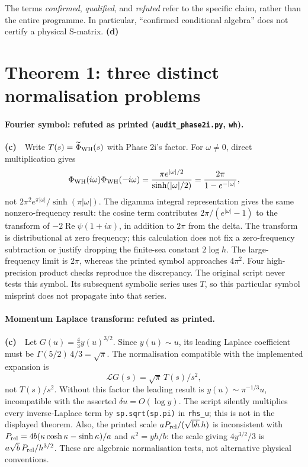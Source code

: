 \documentclass[11pt,a4paper]{article}
\newcommand{\Lc}{\textbf{(c)}\ }
\newcommand{\Ld}{\textbf{(d)}\ }
\newcommand{\scr}{\texttt{audit\_\allowbreak phase2i.py}}
\begin{document}
The terms \emph{confirmed}, \emph{qualified}, and \emph{refuted} refer to the
specific claim, rather than the entire programme. In particular, ``confirmed
conditional algebra'' does not certify a physical S-matrix. \Ld

\section{Theorem 1: three distinct normalisation problems}
\paragraph{Fourier symbol: refuted as printed (\scr, \texttt{wh}).}
\Lc\ Write $T(s)=\widetilde\Phi_{\rm WH}(s)$ with Phase 2i's factor. For
$\omega\ne0$, direct multiplication gives
\begin{equation}
 \Phi_{\rm WH}(i\omega)\Phi_{\rm WH}(-i\omega)
 =\frac{\pi e^{|\omega|/2}}{\sinh(|\omega|/2)}
 =\frac{2\pi}{1-e^{-|\omega|}},
 \label{eq:symbol}
\end{equation}
not $2\pi^2 e^{\pi|\omega|}/\sinh(\pi|\omega|)$.
The digamma integral representation gives the same nonzero-frequency result:
the cosine term contributes $2\pi/(e^{|\omega|}-1)$ to the transform of
$-2\operatorname{Re}\psi(1+ix)$, in addition to $2\pi$ from the delta.
The transform is distributional at zero frequency; this calculation does not
fix a zero-frequency subtraction or justify dropping the finite-sea constant
$2\log h$. The large-frequency limit is $2\pi$, whereas the printed symbol
approaches $4\pi^2$. Four high-precision product checks reproduce the discrepancy.
The original script never tests this symbol. Its subsequent symbolic series
uses $T$, so this particular symbol misprint does not propagate into that series.

\paragraph{Momentum Laplace transform: refuted as printed.}
\Lc\ Let $G(u)=\frac43y(u)^{3/2}$. Since $y(u)\sim u$, its leading Laplace
coefficient must be $\Gamma(5/2)\,4/3=\sqrt\pi$. The normalisation compatible
with the implemented expansion is
\begin{equation}
 \mathcal L G(s)=\sqrt\pi\,T(s)/s^2,
 \label{eq:correctG}
\end{equation}
not $T(s)/s^2$. Without this factor the leading result is
$y(u)\sim\pi^{-1/3}u$, incompatible with the asserted $\delta u=O(\log y)$.
The script silently multiplies every inverse-Laplace term by
\texttt{sp.sqrt(sp.pi)} in \texttt{rhs\_u}; this is not in the displayed theorem.
Also, the printed scale $aP_{\rm rel}/(\sqrt{bh}\,h)$ is inconsistent with
$P_{\rm rel}=4b(\kappa\cosh\kappa-\sinh\kappa)/a$ and
$\kappa^2=yh/b$: the scale giving $4y^{3/2}/3$ is
$a\sqrt b\,P_{\rm rel}/h^{3/2}$. These are algebraic normalisation tests,
not alternative physical conventions.
\end{document}
